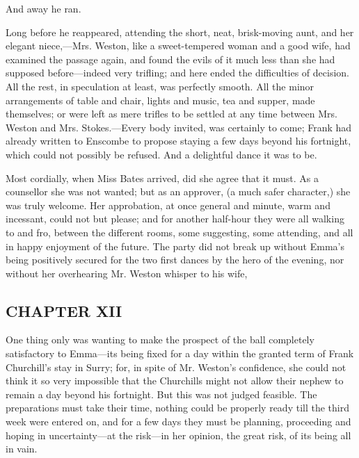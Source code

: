  And away he ran.

Long before he reappeared, attending the short, neat, brisk-moving aunt, and her elegant niece,---Mrs. Weston, like a sweet-tempered woman and a good wife, had examined the passage again, and found the evils of it much less than she had supposed before---indeed very trifling; and here ended the difficulties of decision. All the rest, in speculation at least, was perfectly smooth. All the minor arrangements of table and chair, lights and music, tea and supper, made themselves; or were left as mere trifles to be settled at any time between Mrs. Weston and Mrs. Stokes.---Every body invited, was certainly to come; Frank had already written to Enscombe to propose staying a few days beyond his fortnight, which could not possibly be refused. And a delightful dance it was to be.

Most cordially, when Miss Bates arrived, did she agree that it must. As a counsellor she was not wanted; but as an approver, (a much safer character,) she was truly welcome. Her approbation, at once general and minute, warm and incessant, could not but please; and for another half-hour they were all walking to and fro, between the different rooms, some suggesting, some attending, and all in happy enjoyment of the future. The party did not break up without Emma's being positively secured for the two first dances by the hero of the evening, nor without her overhearing Mr. Weston whisper to his wife, 

\subsection[chapter-xii-1]{\useURL[url31][][][]\from[url31]CHAPTER XII}

One thing only was wanting to make the prospect of the ball completely satisfactory to Emma---its being fixed for a day within the granted term of Frank Churchill's stay in Surry; for, in spite of Mr. Weston's confidence, she could not think it so very impossible that the Churchills might not allow their nephew to remain a day beyond his fortnight. But this was not judged feasible. The preparations must take their time, nothing could be properly ready till the third week were entered on, and for a few days they must be planning, proceeding and hoping in uncertainty---at the risk---in her opinion, the great risk, of its being all in vain.


